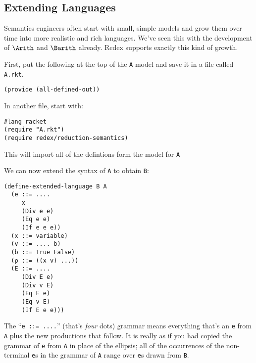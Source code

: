 \subsection{Extending Languages}

Semantics engineers often start with small, simple models and grow
them over time into more realistic and rich languages.  We've seen
this with the development of $\Arith$ and $\Barith$ already.  Redex
supports exactly this kind of growth.

First, put the following at the top of the {\tt A} model and save it
in a file called {\tt A.rkt}.
\begin{verbatim}
(provide (all-defined-out))
\end{verbatim}

In another file, start with:
\begin{verbatim}
#lang racket
(require "A.rkt")
(require redex/reduction-semantics)
\end{verbatim}
This will import all of the defintions form the model for {\tt A}

We can now extend the syntax of {\tt A} to obtain {\tt B}:
\begin{verbatim}
(define-extended-language B A
  (e ::= ....
     x
     (Div e e)
     (Eq e e)
     (If e e e))
  (x ::= variable)
  (v ::= .... b)
  (b ::= True False)
  (ρ ::= ((x v) ...))
  (E ::= ....
     (Div E e)
     (Div v E)
     (Eq E e)
     (Eq v E)
     (If E e e)))
\end{verbatim}
The ``{\tt e ::= ....}'' (that's \emph{four} dots) grammar means
everything that's an {\tt e} from {\tt A} plus the new productions
that follow.  It is really as if you had copied the grammar of {\tt e}
from {\tt A} in place of the ellipsis; all of the occurrences of the
non-terminal {\tt e}s in the grammar of {\tt A} range over {\tt e}s
drawn from {\tt B}.

